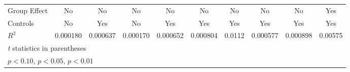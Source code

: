 {\begin{tabular}{l*{9}{c}}
Group Effect    &       No         &       No         &       No         &       No         &       No         &       No         &       No         &       No         &      Yes         \\
Controls        &       No         &      Yes         &       No         &      Yes         &      Yes         &      Yes         &      Yes         &      Yes         &      Yes         \\
$ R^2 $         & 0.000180         & 0.000637         & 0.000170         & 0.000652         & 0.000804         &   0.0112         & 0.000577         & 0.000898         &  0.00575         \\
\hline\hline
\multicolumn{10}{l}{\footnotesize \textit{t} statistics in parentheses}\\
\multicolumn{10}{l}{\footnotesize \sym{*} \(p<0.10\), \sym{**} \(p<0.05\), \sym{***} \(p<0.01\)}\\
\end{tabular}
}
